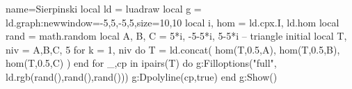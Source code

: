 \begin{luadraw}{name=Sierpinski}
local ld = luadraw
local g = ld.graph:new{window={-5,5,-5,5},size={10,10}}
local i, hom = ld.cpx.I, ld.hom
local rand = math.random
local A, B, C = 5*i, -5-5*i, 5-5*i -- triangle initial
local T, niv = {{A,B,C}}, 5
for k = 1, niv do
    T = ld.concat( hom(T,0.5,A), hom(T,0.5,B), hom(T,0.5,C) )
end
for _,cp in ipairs(T) do
    g:Filloptions("full", ld.rgb(rand(),rand(),rand()))
    g:Dpolyline(cp,true)
end
g:Show()
\end{luadraw}
